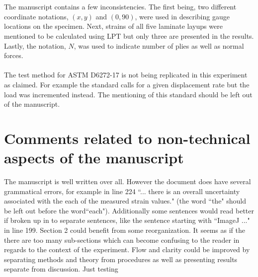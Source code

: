 \documentclass[12pt]{article}
\begin{document}
\\
\\
The manuscript contains a few inconsistencies. The first being, two different coordinate notations, $(x,y)$ and $(0,90)$, were used in describing  gauge locations on the specimen. Next, strains of all five laminate layups were mentioned to be calculated using LPT but only three are presented in the results. Lastly, the notation, $N$, was used to indicate number of plies as well as normal forces.
\\
\\
The test method for ASTM D6272-17 is not being replicated in this experiment as claimed. For example the standard calls for a given displacement rate but the load was incremented instead. The mentioning of this standard should be left out of the manuscript.  
\section*{Comments related to non-technical aspects of the manuscript} 

The manuscript is well written over all. However the document does have several grammatical errors, for example in line 224 ``... there is an overall uncertainty associated with the each of the measured strain values." (the word ``the" should be left out before the word``each"). Additionally some sentences would read better if broken up in to separate sentences, like the sentence starting with ``ImageJ ..." in line 199. 
Section 2 could benefit from some reorganization. It seems as if the there are too many sub-sections which can become confusing to the reader in regards to the context of the experiment.  Flow and clarity could be improved by separating methods and theory from procedures as well as presenting results separate from discussion. Just testing
\end{document}
